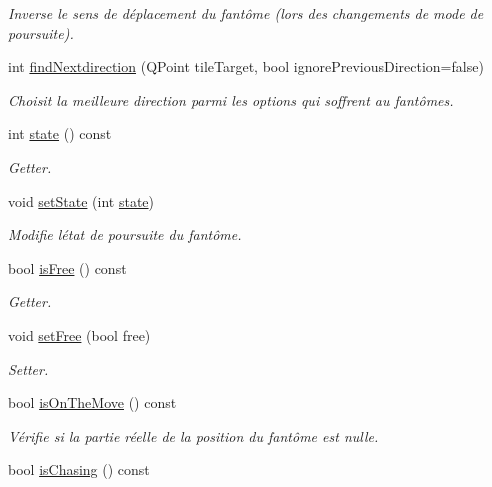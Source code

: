 \begin{DoxyCompactItemize}
\begin{DoxyCompactList}\small\item\em Inverse le sens de déplacement du fantôme (lors des changements de mode de poursuite). \end{DoxyCompactList}\item 
int \hyperlink{class_ghost_ac3966bbfe1af0b639d983f20289954f9}{find\+Nextdirection} (Q\+Point tile\+Target, bool ignore\+Previous\+Direction=false)
\begin{DoxyCompactList}\small\item\em Choisit la meilleure direction parmi les options qui s\textquotesingle{}offrent au fantômes. \end{DoxyCompactList}\item 
int \hyperlink{class_ghost_a9aa8db09a42bad7bd62bb336d0b5c89d}{state} () const 
\begin{DoxyCompactList}\small\item\em Getter. \end{DoxyCompactList}\item 
void \hyperlink{class_ghost_a29195fe389663ae6af139466042bd97c}{set\+State} (int \hyperlink{class_ghost_a9aa8db09a42bad7bd62bb336d0b5c89d}{state})
\begin{DoxyCompactList}\small\item\em Modifie l\textquotesingle{}état de poursuite du fantôme. \end{DoxyCompactList}\item 
bool \hyperlink{class_ghost_a990b12906e22b5064e56d3f961f7c2a9}{is\+Free} () const 
\begin{DoxyCompactList}\small\item\em Getter. \end{DoxyCompactList}\item 
void \hyperlink{class_ghost_a8f20887030473a8ceae63f2fe7722a28}{set\+Free} (bool free)
\begin{DoxyCompactList}\small\item\em Setter. \end{DoxyCompactList}\item 
bool \hyperlink{class_ghost_abd3f24e1a2f245865592ba5de5adbcba}{is\+On\+The\+Move} () const 
\begin{DoxyCompactList}\small\item\em Vérifie si la partie réelle de la position du fantôme est nulle. \end{DoxyCompactList}\item 
bool \hyperlink{class_ghost_ae1f2d6e6bbedde18fd5f0465eaf20c08}{is\+Chasing} () const 

\end{DoxyCompactItemize}
